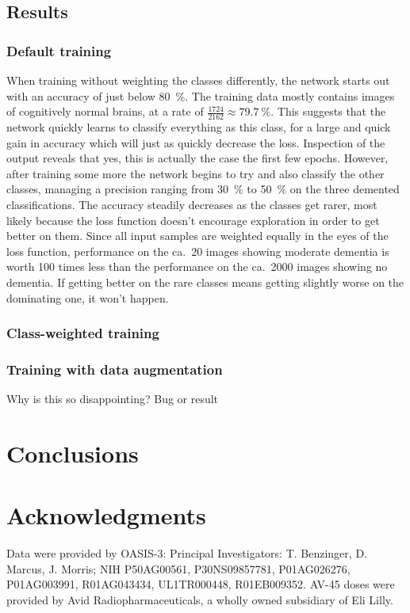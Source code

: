\documentclass{kththesis}
\begin{document}
\section{Results}
\subsection{Default training}
When training without weighting the classes differently, the network starts out with an accuracy of just below 80~\%. The training data mostly contains images of cognitively normal brains, at a rate of $\frac{1724}{2162} \approx 79.7~\%$. This suggests that the network quickly learns to classify everything as this class, for a large and quick gain in accuracy which will just as quickly decrease the loss. Inspection of the output reveals that yes, this is actually the case the first few epochs. However, after training some more the network begins to try and also classify the other classes, managing a precision ranging from 30~\% to 50~\% on the three demented classifications. The accuracy steadily decreases as the classes get rarer, most likely because the loss function doesn't encourage exploration in order to get better on them. Since all input samples are weighted equally in the eyes of the loss function, performance on the ca.\ 20 images showing moderate dementia is worth 100 times less than the performance on the ca.\ \num{2000} images showing no dementia. If getting better on the rare classes means getting slightly worse on the dominating one, it won't happen.

\subsection{Class-weighted training}


\subsection{Training with data augmentation}
Why is this so disappointing? Bug or result

\chapter{Conclusions}

\chapter{Acknowledgments}
Data were provided by OASIS-3: Principal Investigators: T. Benzinger, D. Marcus, J. Morris; NIH P50AG00561, P30NS09857781, P01AG026276, P01AG003991, R01AG043434, UL1TR000448, R01EB009352. AV-45 doses were provided by Avid Radiopharmaceuticals, a wholly owned subsidiary of Eli Lilly.

\printbibliography[heading=bibintoc]

\appendix


\tailmatter
\end{document}
